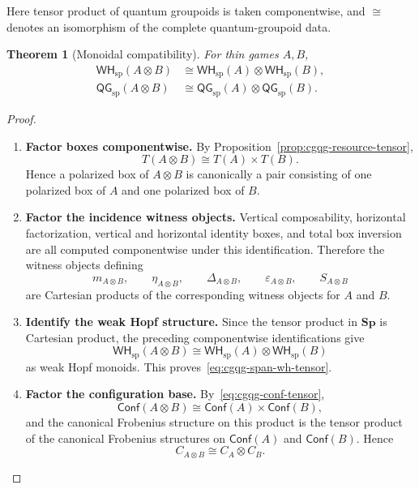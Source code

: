 \documentclass[oneside]{article}
\newcommand{\Conf}{\mathsf{Conf}}
\newcommand{\WH}{\mathsf{WH}}
\newcommand{\QG}{\mathsf{QG}}
\newcommand{\Sp}{\mathbf{Sp}}
\theoremstyle{plain}
\newtheorem{theorem}{Theorem}[section]
\theoremstyle{definition}
\theoremstyle{remark}
\begin{document}
Here tensor product of quantum groupoids is taken componentwise, and \(\cong\) denotes an isomorphism of the complete quantum-groupoid data.

\begin{theorem}[Monoidal compatibility]
\label{thm:cgqg-qg-tensor}
    For thin games \(A,B\),
    \begin{align}
        \WH_{\mathrm{sp}}(A\otimes B)
        &\cong
        \WH_{\mathrm{sp}}(A)\otimes\WH_{\mathrm{sp}}(B),
        \label{eq:cgqg-span-wh-tensor}\\
        \QG_{\mathrm{sp}}(A\otimes B)
        &\cong
        \QG_{\mathrm{sp}}(A)\otimes\QG_{\mathrm{sp}}(B).
        \label{eq:cgqg-qg-tensor}
    \end{align}
\end{theorem}
\begin{proof}
    \leavevmode
    \begin{enumerate}[beginpenalty=10000]
        \item \textbf{Factor boxes componentwise.} By Proposition~\ref{prop:cgqg-resource-tensor},
        \[
            T(A\otimes B)
            \cong
            T(A)\times T(B).
        \]
        Hence a polarized box of \(A\otimes B\) is canonically a pair consisting of one polarized box of \(A\) and one polarized box of \(B\).

        \item \textbf{Factor the incidence witness objects.} Vertical composability, horizontal factorization, vertical and horizontal identity boxes, and total box inversion are all computed componentwise under this identification. Therefore the witness objects defining
        \[
            m_{A\otimes B},
            \qquad
            \eta_{A\otimes B},
            \qquad
            \Delta_{A\otimes B},
            \qquad
            \varepsilon_{A\otimes B},
            \qquad
            S_{A\otimes B}
        \]
        are Cartesian products of the corresponding witness objects for \(A\) and \(B\).

        \item \textbf{Identify the weak Hopf structure.} Since the tensor product in \(\Sp\) is Cartesian product, the preceding componentwise identifications give
        \[
            \WH_{\mathrm{sp}}(A\otimes B)
            \cong
            \WH_{\mathrm{sp}}(A)\otimes\WH_{\mathrm{sp}}(B)
        \]
        as weak Hopf monoids. This proves~\eqref{eq:cgqg-span-wh-tensor}.

        \item \textbf{Factor the configuration base.} By~\eqref{eq:cgqg-conf-tensor},
        \[
            \Conf(A\otimes B)
            \cong
            \Conf(A)\times\Conf(B),
        \]
        and the canonical Frobenius structure on this product is the tensor product of the canonical Frobenius structures on \(\Conf(A)\) and \(\Conf(B)\). Hence
        \[
            C_{A\otimes B}
            \cong
            C_A\otimes C_B.
        \]


\end{enumerate}
\end{proof}
\end{document}
